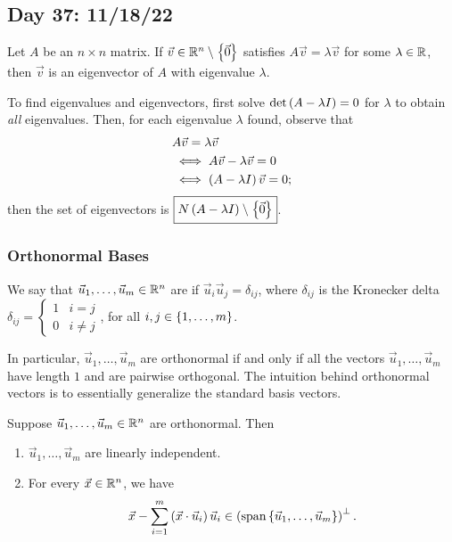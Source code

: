 \documentclass[main.tex]{subfiles}
\begin{document}
\subsection{Day 37: 11/18/22}

\begin{definition}
    Let $A$ be an $n\times n$ matrix. If $\vec{v}\in \mathbb R^n\setminus\left\{ \vec{0} \right\}$ satisfies $A\vec{v} = \lambda\vec{v}$ for some $\lambda\in \mathbb R$, then $\vec{v}$ is an eigenvector of $A$ with eigenvalue $\lambda$.
\end{definition}

To find eigenvalues and eigenvectors, first solve $\det\left( A - \lambda I \right) = 0$ for $\lambda$ to obtain \textit{all} eigenvalues. Then, for each eigenvalue $\lambda$ found, observe that
\begin{align*}
    &A\vec{v} = \lambda\vec{v} \\
    &\iff A\vec{v} - \lambda\vec{v} = 0 \\
    &\iff \left( A - \lambda I \right)\vec{v} = 0;
\end{align*}
then the set of eigenvectors is $\boxed{N\left( A - \lambda I \right)\setminus\left\{ \vec{0} \right\}}$.

\subsubsection{Orthonormal Bases}
\begin{definition}
    We say that $\vec{u}_1, \ldots , \vec{u}_m\in \mathbb R^n$ are  if $\vec{u}_i\vec{u}_j=\delta_{ij}$, where $\delta_{ij}$ is the Kronecker delta $\delta_{ij} = \begin{cases}1 & i = j \\ 0 & i \neq j\end{cases}$, for all $i, j\in \left\{ 1, \ldots , m \right\}$.
\end{definition}
In particular, $\vec{u}_1, \ldots , \vec{u}_m$ are orthonormal if and only if all the vectors $\vec{u}_1, \ldots , \vec{u}_m$ have length $1$ and are pairwise orthogonal. The intuition behind orthonormal vectors is to essentially generalize the standard basis vectors.

\begin{proposition}
    Suppose $\vec{u}_1, \ldots , \vec{u}_m\in \mathbb R^n$ are orthonormal. Then
    \begin{enumerate}
        \item $\vec{u}_1, \ldots , \vec{u}_m$ are linearly independent.
        \item For every $\vec{x}\in \mathbb R^n$, we have
        \[\vec{x} - \sum_{i = 1}^m \left( \vec{x}\cdot \vec{u}_i \right)\vec{u}_i\in \left( \operatorname{span}\left\{ \vec{u}_1, \ldots , \vec{u}_m \right\} \right)^\perp.\]
    \end{enumerate}
\end{proposition}
\end{document}
